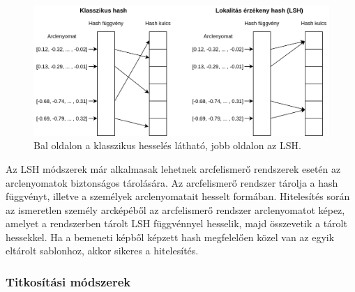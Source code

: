 \begin{figure}[ht]
	\centering
	\includegraphics[width=1\columnwidth]{figures/lsh.png}
	\caption{Bal oldalon a klasszikus hesselés látható, jobb oldalon az LSH.}
	\label{fig:lsh}
\end{figure}

Az LSH módszerek már alkalmasak lehetnek arcfelismerő rendszerek esetén az arclenyomatok biztonságos tárolására. Az arcfelismerő rendszer tárolja a hash függvényt, illetve a személyek arclenyomatait hesselt formában. Hitelesítés során az ismeretlen személy arcképéből az arcfelismerő rendszer arclenyomatot képez, amelyet a rendszerben tárolt LSH függvénnyel hesselik, majd összevetik a tárolt hessekkel. Ha a bemeneti képből képzett hash megfelelően közel van az egyik eltárolt sablonhoz, akkor sikeres a hitelesítés.



\subsubsection{Titkosítási módszerek} %


